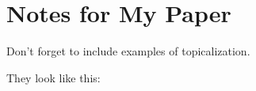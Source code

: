 \documentclass[12pt]{article}
\begin{document}
\section*{Notes for My Paper}

Don't forget to include examples of topicalization.

They look like this:
\end{document}
